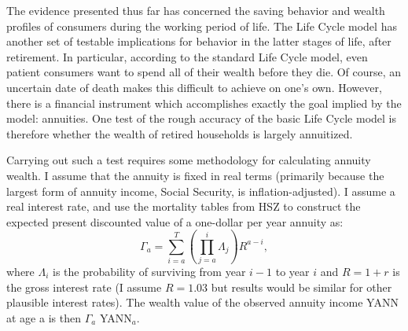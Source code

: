 \documentclass[titlepage,12pt]{article}
\begin{document}

The evidence presented thus far has concerned the saving behavior and 
wealth profiles of consumers during the working period of life.  The 
Life Cycle model has another set of testable implications for behavior 
in the latter stages of life, after retirement.  In particular, 
according to the standard Life Cycle model, even patient consumers 
want to spend all of their wealth before they die.  Of course, an 
uncertain date of death makes this difficult to achieve on one's own.  
However, there is a financial instrument which accomplishes exactly 
the goal implied by the model: annuities.  One test of the rough 
accuracy of the basic Life Cycle model is therefore whether the wealth 
of retired households is largely annuitized.

Carrying out such a test requires some methodology for calculating 
annuity wealth.  I assume that the annuity is fixed in real terms 
(primarily because the largest form of annuity income, Social 
Security, is inflation-adjusted).  I assume a real interest rate, and 
use the mortality tables from HSZ to construct the expected present 
discounted value of a one-dollar per year annuity as:
\begin{equation}
\Gamma_{a} = \sum_{i=a}^{T} \left(\prod_{j=a}^{i} \Lambda_{j}\right) R^{a-i},
\end{equation}
where $\Lambda_{i}$ is the probability of surviving from year $i-1$ to 
year $i$ and $R=1+r$ is the gross interest rate (I assume $R=1.03$ but 
results would be similar for other plausible interest rates).  The 
wealth value of the observed annuity income YANN at age a is then 
$\Gamma_{a}$ YANN$_{a}$.
\end{document}
